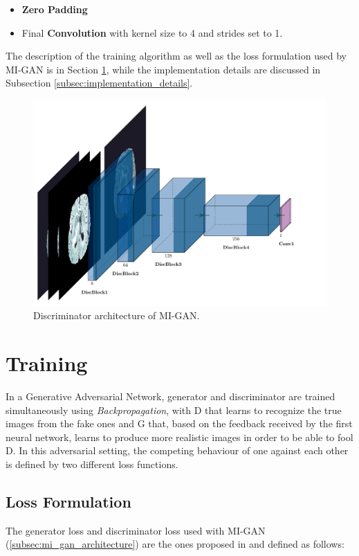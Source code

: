 \begin{itemize}
\item \textbf{Zero Padding}
\item Final \textbf{Convolution} with kernel size to 4 and strides set to 1.
\end{itemize}

\noindent The description of the training algorithm as well as the loss formulation used by MI-GAN is in Section \ref{sec:training}, while the implementation details are discussed in Subsection \ref{subsec:implementation_details}.

\begin{figure}[H]
\centering
\includegraphics[height=0.335\textheight]{images/MIGAN_discriminator.pdf}
\caption[Discriminator architecture of MI-GAN]{Discriminator architecture of MI-GAN.}
\label{fig:MIGAN_discriminator}
\end{figure}

\section{Training}
\label{sec:training}
In a Generative Adversarial Network, generator and discriminator are trained simultaneously using \textit{Backpropagation}, with D that learns to recognize the true images from the fake ones and G that, based on the feedback received by the first neural network, learns to produce more realistic images in order to be able to fool D. In this adversarial setting, the competing behaviour of one against each other is defined by two different loss functions.

\subsection{Loss Formulation}
\label{subsec:loss_formulation}
The generator loss and discriminator loss used with MI-GAN (\ref{subsec:mi_gan_architecture}) are the ones proposed in \cite{pix2pix} and defined as follows: 

